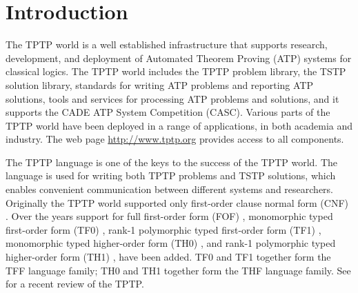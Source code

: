 \documentclass{easychair}
\begin{document}
\renewcommand{\implies}{\Rightarrow}
\newcommand{\liff}{\Leftrightarrow}
\newcommand{\lniff}{\not\Leftrightarrow}
\newcommand{\bool}{\mathit{bool}}
\renewcommand*{\phi}{\varphi}

\section{Introduction}
\label{Introduction}

The TPTP world \cite{Sut10} is a well established infrastructure that supports
research, development, and deployment of Automated Theorem Proving (ATP)
systems for classical logics.
The TPTP world includes the TPTP problem library,
the TSTP solution library,
standards for writing ATP problems and reporting ATP solutions,
tools and services for processing ATP problems and solutions,
and it supports the CADE ATP System Competition (CASC).
Various parts of the TPTP world have been deployed in a range of applications,
in both academia and industry.
The web page \url{http://www.tptp.org} provides access to all components.

The TPTP language is one of the keys to the success of the TPTP world.
The language is used for writing both TPTP problems and TSTP solutions,
which enables convenient communication between different systems and
researchers.
Originally the TPTP world supported only first-order clause normal form (CNF)
\cite{SS98-JAR}.
Over the years support for full first-order form (FOF) \cite{Sut09},
monomorphic typed first-order form (TF0) \cite{SS+12}, rank-1 polymorphic
typed first-order form (TF1) \cite{BP13-TFF1}, monomorphic typed higher-order 
form (TH0) \cite{SB10}, and rank-1 polymorphic typed higher-order form (TH1) 
\cite{KSR16}, have been added.
TF0 and TF1 together form the TFF language family; TH0 and TH1 together form 
the THF language family.
See \cite{Sut17} for a recent review of the TPTP.
\end{document}
